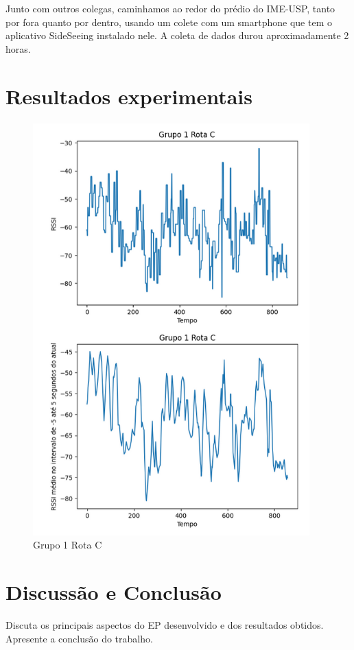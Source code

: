 \documentclass{article}
\begin{document}
Junto com outros colegas, caminhamos ao redor do prédio do IME-USP, tanto por fora quanto por
dentro, usando um colete com um smartphone que tem o aplicativo SideSeeing instalado nele. A coleta
de dados durou aproximadamente 2 horas.  

\section{Resultados experimentais}
\begin{figure}
  \begin{center}
    \includegraphics[width=0.95\textwidth]{figures/grupo_1-rota_c}
  \end{center}
  \caption{Grupo 1 Rota C}\label{fig:grupo_1-rota_c}
\end{figure}


\section{Discussão e Conclusão}

Discuta os principais aspectos do EP desenvolvido e dos resultados obtidos. Apresente a conclusão do trabalho.
\end{document}
